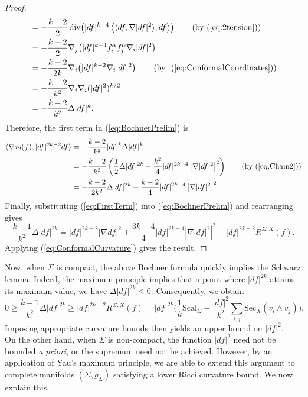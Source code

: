 \documentclass[11pt]{article}
\theoremstyle{definition}
\numberwithin{equation}{section}
\begin{document}
\begin{proof}
\begin{align*}
& = -\frac{k-2}{2}\,\mathrm{div}\!\left( |df|^{k-4} \left\langle \langle df, \nabla |df|^2 \rangle, df \right\rangle \right) \tag{\text{by }(\ref{eq:2tension})} \\
& = -\frac{k-2}{2} \nabla_j \!\left( |df|^{k-4} f^\alpha_i f^\alpha_j \nabla_i |df|^2  \right)  \\
& = -\frac{k-2}{2k} \nabla_i \!\left( |df|^{k-2} \nabla_i |df|^2 \right) \tag{\text{by } (\ref{eq:ConformalCoordinates})}  \\
& = -\frac{k-2}{k^2} \nabla_i \nabla_i (|df|^2)^{k/2}  \\
& = -\frac{k-2}{k^2} \Delta |df|^k.
\end{align*}
Therefore, the first term in (\ref{eq:BochnerPrelim}) is
\begin{align}
\langle \nabla \tau_2(f), |df|^{2k-2}df \rangle & = -\frac{k-2}{k^2} |df|^k \Delta |df|^k \notag \\
& = -\frac{k-2}{k^2} \left( \frac{1}{2} \Delta |df|^{2k} - \frac{k^2}{4} |df|^{2k-4} \left| \nabla |df|^2 \right|^2  \right) \tag{\text{by }(\ref{eq:Chain2})} \\
& = -\frac{k-2}{2k^2} \Delta |df|^{2k} +  \frac{k-2}{4}  |df|^{2k-4} \left| \nabla |df|^2 \right|^2. \label{eq:FirstTerm}
\end{align}
Finally, substituting (\ref{eq:FirstTerm}) into (\ref{eq:BochnerPrelim}) and rearranging gives
$$\frac{k-1}{k^2} \Delta |df|^{2k} = |df|^{2k-2} | \nabla df |^2 + \frac{3k-4}{4}|df|^{2k-4} \left| \nabla |df|^2 \right|^2 + |df|^{2k-2} R^{\Sigma, X}(f).$$
Applying (\ref{eq:ConformalCurvature}) gives the result.
\end{proof}

\indent Now, when $\Sigma$ is compact, the above Bochner formula quickly implies the Schwarz lemma.  Indeed, the maximum principle implies that a point where $|df|^{2k}$ attains its maximum value, we have $\Delta |df|^{2k} \leq 0$.  Consequently, we obtain
$$ 0 \geq \frac{k-1}{k^2}  \Delta|df|^{2k} \geq |df|^{2k-2} R^{\Sigma, X}(f) = |df|^{2k}\Big( \frac{1}{k}\mathrm{Scal}_\Sigma - \frac{|df|^2}{k^2} \sum_{i,j} \mathrm{Sec}_X( v_i \wedge v_j) \Big).$$
Imposing appropriate curvature bounds then yields an upper bound on $|df|^2$. \\
\indent On the other hand, when $\Sigma$ is non-compact, the function $|df|^2$ need not be bounded \emph{a priori}, or the supremum need not be achieved.  However, by an application of Yau's maximum principle, we are able to extend this argument to complete manifolds $(\Sigma, g_\Sigma)$ satisfying a lower Ricci curvature bound.  We now explain this.
\end{document}
